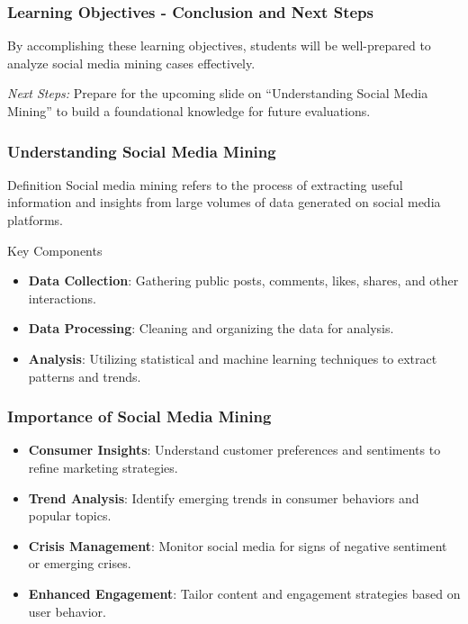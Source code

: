 \documentclass{beamer}
\begin{document}
\begin{frame}[fragile]
    \frametitle{Learning Objectives - Conclusion and Next Steps}
    By accomplishing these learning objectives, students will be well-prepared to analyze social media mining cases effectively. 

    \textit{Next Steps:} Prepare for the upcoming slide on “Understanding Social Media Mining” to build a foundational knowledge for future evaluations.
\end{frame}

\begin{frame}[fragile]
    \frametitle{Understanding Social Media Mining}
    \begin{block}{Definition}
        Social media mining refers to the process of extracting useful information and insights from large volumes of data generated on social media platforms.
    \end{block}
    
    \begin{block}{Key Components}
        \begin{itemize}
            \item \textbf{Data Collection}: Gathering public posts, comments, likes, shares, and other interactions.
            \item \textbf{Data Processing}: Cleaning and organizing the data for analysis.
            \item \textbf{Analysis}: Utilizing statistical and machine learning techniques to extract patterns and trends.
        \end{itemize}
    \end{block}
\end{frame}

\begin{frame}[fragile]
    \frametitle{Importance of Social Media Mining}
    \begin{itemize}
        \item \textbf{Consumer Insights}: Understand customer preferences and sentiments to refine marketing strategies.
        \item \textbf{Trend Analysis}: Identify emerging trends in consumer behaviors and popular topics.
        \item \textbf{Crisis Management}: Monitor social media for signs of negative sentiment or emerging crises.
        \item \textbf{Enhanced Engagement}: Tailor content and engagement strategies based on user behavior.
    \end{itemize}
\end{frame}
\end{document}
